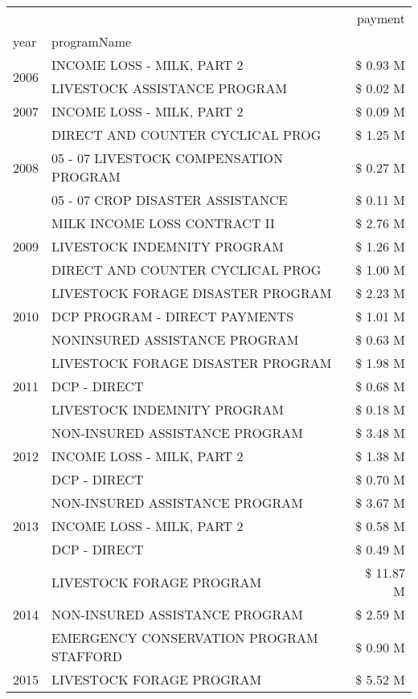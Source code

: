 \begin{tabular}{llr}
\toprule
 &  & payment \\
year & programName &  \\
\midrule
\multirow[t]{2}{*}{2006} & INCOME LOSS - MILK, PART 2 & \$ 0.93 M \\
 & LIVESTOCK ASSISTANCE PROGRAM & \$ 0.02 M \\
\cline{1-3}
2007 & INCOME LOSS - MILK, PART 2 & \$ 0.09 M \\
\cline{1-3}
\multirow[t]{3}{*}{2008} & DIRECT AND COUNTER CYCLICAL PROG & \$ 1.25 M \\
 & 05 - 07 LIVESTOCK COMPENSATION PROGRAM & \$ 0.27 M \\
 & 05 - 07 CROP DISASTER ASSISTANCE & \$ 0.11 M \\
\cline{1-3}
\multirow[t]{3}{*}{2009} & MILK INCOME LOSS CONTRACT II & \$ 2.76 M \\
 & LIVESTOCK INDEMNITY PROGRAM & \$ 1.26 M \\
 & DIRECT AND COUNTER CYCLICAL PROG & \$ 1.00 M \\
\cline{1-3}
\multirow[t]{3}{*}{2010} & LIVESTOCK FORAGE DISASTER  PROGRAM & \$ 2.23 M \\
 & DCP PROGRAM - DIRECT PAYMENTS & \$ 1.01 M \\
 & NONINSURED ASSISTANCE PROGRAM & \$ 0.63 M \\
\cline{1-3}
\multirow[t]{3}{*}{2011} & LIVESTOCK FORAGE DISASTER PROGRAM & \$ 1.98 M \\
 & DCP - DIRECT & \$ 0.68 M \\
 & LIVESTOCK INDEMNITY PROGRAM & \$ 0.18 M \\
\cline{1-3}
\multirow[t]{3}{*}{2012} & NON-INSURED ASSISTANCE PROGRAM & \$ 3.48 M \\
 & INCOME LOSS - MILK, PART 2 & \$ 1.38 M \\
 & DCP - DIRECT & \$ 0.70 M \\
\cline{1-3}
\multirow[t]{3}{*}{2013} & NON-INSURED ASSISTANCE PROGRAM & \$ 3.67 M \\
 & INCOME LOSS - MILK, PART 2 & \$ 0.58 M \\
 & DCP - DIRECT & \$ 0.49 M \\
\cline{1-3}
\multirow[t]{3}{*}{2014} & LIVESTOCK FORAGE PROGRAM & \$ 11.87 M \\
 & NON-INSURED ASSISTANCE PROGRAM & \$ 2.59 M \\
 & EMERGENCY CONSERVATION PROGRAM STAFFORD & \$ 0.90 M \\
\cline{1-3}
\multirow[t]{3}{*}{2015} & LIVESTOCK FORAGE PROGRAM & \$ 5.52 M \\

\end{tabular}
